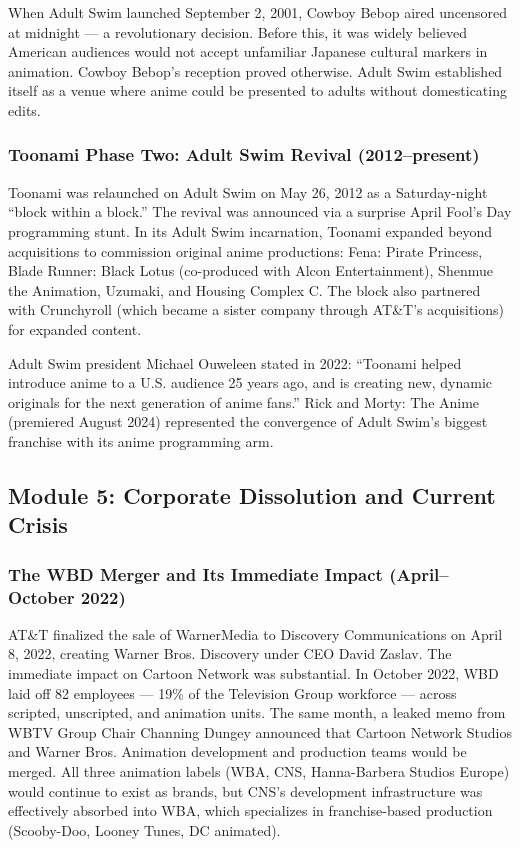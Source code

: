 \documentclass[11pt,letterpaper]{article}
\begin{document}
When Adult Swim launched September 2, 2001, Cowboy Bebop aired uncensored at midnight --- a revolutionary decision. Before this, it was widely believed American audiences would not accept unfamiliar Japanese cultural markers in animation. Cowboy Bebop's reception proved otherwise. Adult Swim established itself as a venue where anime could be presented to adults without domesticating edits.

\subsubsection{Toonami Phase Two: Adult Swim Revival (2012--present)}

Toonami was relaunched on Adult Swim on May 26, 2012 as a Saturday-night ``block within a block.'' The revival was announced via a surprise April Fool's Day programming stunt. In its Adult Swim incarnation, Toonami expanded beyond acquisitions to commission original anime productions: Fena: Pirate Princess, Blade Runner: Black Lotus (co-produced with Alcon Entertainment), Shenmue the Animation, Uzumaki, and Housing Complex C. The block also partnered with Crunchyroll (which became a sister company through AT\&T's acquisitions) for expanded content.

Adult Swim president Michael Ouweleen stated in 2022: ``Toonami helped introduce anime to a U.S. audience 25 years ago, and is creating new, dynamic originals for the next generation of anime fans.'' Rick and Morty: The Anime (premiered August 2024) represented the convergence of Adult Swim's biggest franchise with its anime programming arm.

\subsection{Module 5: Corporate Dissolution and Current Crisis}

\subsubsection{The WBD Merger and Its Immediate Impact (April--October 2022)}

AT\&T finalized the sale of WarnerMedia to Discovery Communications on April 8, 2022, creating Warner Bros. Discovery under CEO David Zaslav. The immediate impact on Cartoon Network was substantial. In October 2022, WBD laid off 82 employees --- 19\% of the Television Group workforce --- across scripted, unscripted, and animation units. The same month, a leaked memo from WBTV Group Chair Channing Dungey announced that Cartoon Network Studios and Warner Bros. Animation development and production teams would be merged. All three animation labels (WBA, CNS, Hanna-Barbera Studios Europe) would continue to exist as brands, but CNS's development infrastructure was effectively absorbed into WBA, which specializes in franchise-based production (Scooby-Doo, Looney Tunes, DC animated).
\end{document}

